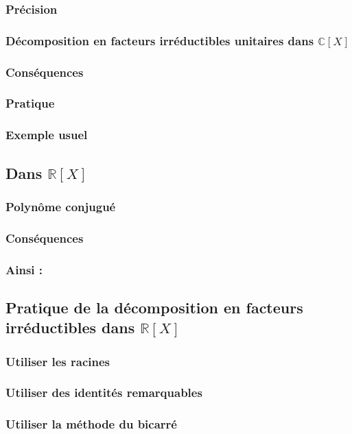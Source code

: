 \documentclass[12pt,a4paper,french]{book}
\begin{document}
			\subsubsection{Précision}
			\subsubsection{Décomposition en facteurs irréductibles unitaires dans $\mathbb{C}[X]$}
			\subsubsection{Conséquences}
			\subsubsection{Pratique}
			\subsubsection{Exemple usuel}
		\subsection{Dans $\mathbb{R}[X]$}
			\subsubsection{Polynôme conjugué}
			\subsubsection{Conséquences}
			\subsubsection{Ainsi :}
		\subsection{Pratique de la décomposition en facteurs irréductibles dans $\mathbb{R}[X]$}
			\subsubsection{Utiliser les racines}
			\subsubsection{Utiliser des identités remarquables}
			\subsubsection{Utiliser la méthode du bicarré}
\end{document}
